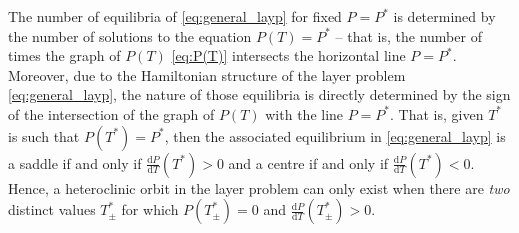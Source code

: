\documentclass[a4paper,10pt,abstract=true,parskip=true]{scrartcl}
\theoremstyle{remark}
\numberwithin{equation}{section}
\numberwithin{thm}{section}
\newcommand{\eps}{\varepsilon}
\begin{document}
The number of equilibria of \eqref{eq:general_layp} for fixed $P = P^\ast$ is determined by the number of solutions to the equation $P(T) = P^\ast$ -- that is, the number of times the graph of $P(T)$ \eqref{eq:P(T)} intersects the horizontal line $P = P^\ast$. Moreover, due to the Hamiltonian structure of the layer problem \eqref{eq:general_layp}, the nature of those equilibria is directly determined by the sign of the intersection of the graph of $P(T)$ with the line $P = P^\ast$. That is, given $T^\ast$ is such that $P(T^\ast) = P^\ast$, then the associated equilibrium in \eqref{eq:general_layp} is a saddle if and only if $\frac{\text{d} P}{\text{d}T}(T^\ast) > 0$ and a centre if and only if $\frac{\text{d} P}{\text{d}T}(T^\ast) < 0$. Hence, a heteroclinic orbit in the layer problem can only exist when there are \emph{two} distinct values $T^\ast_\pm$ for which $P(T^\ast_\pm) = 0$ and $\frac{\text{d} P}{\text{d} T}(T^\ast_\pm) > 0$. \\



\end{document}
